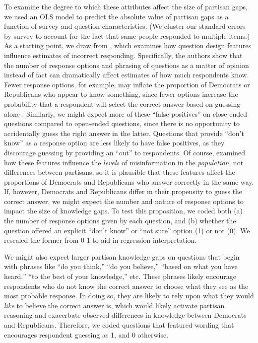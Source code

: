 \documentclass[12pt, letterpaper]{article}
\begin{document}
To examine the degree to which these attributes affect the size of partisan gaps, we used an OLS model to predict the absolute value of partisan gaps as a function of survey and question characteristics. (We cluster our standard errors by survey to account for the fact that same people responded to multiple items.) As a starting point, we draw from \citet{luskinetal_nd}, which examines how question design features influence estimates of incorrect responding. Specifically, the authors show that the number of response options and phrasing of questions as a matter of opinion instead of fact can dramatically affect estimates of how much respondents know. Fewer response options, for example, may inflate the proportion of Democrats or Republicans who appear to know something, since fewer options increase the probability that a respondent will select the correct answer based on guessing alone \citep[][4]{luskinetal_nd}. Similarly, we might expect more of these ``false positives'' on close-ended questions compared to open-ended questions, since there is no opportunity to accidentally guess the right answer in the latter. Questions that provide ``don't know'' as a response option are less likely to have false positives, as they discourage guessing by providing an ``out'' to respondents. Of course, \citet{luskinetal_nd} examined how these features influence the \textit{levels} of misinformation in the \textit{population}, not differences between partisans, so it is plausible that these features affect the proportions of Democrats and Republicans who answer correctly in the same way. If, however, Democrats and Republicans differ in their propensity to guess the correct answer, we might expect the number and nature of response options to impact the size of knowledge gaps. To test this proposition, we coded both (a) the number of response options given by each question, and (b) whether the question offered an explicit ``don't know'' or ``not sure'' option (1) or not (0). We rescaled the former from 0-1 to aid in regression interpretation. 

We might also expect larger partisan knowledge gaps on questions that begin with phrases like ``do you think,'' ``do you believe,'' ``based on what you have heard,'' ``to the best of your knowledge,'' etc. These phrases likely encourage respondents who do not know the correct answer to choose what they see as the most probable response. In doing so, they are likely to rely upon what they would \textit{like} to believe the correct answer is, which would likely activate partisan reasoning and exacerbate observed differences in knowledge between Democrats and Republicans. Therefore, we coded questions that featured wording that encourages respondent guessing as 1, and 0 otherwise. 
\end{document}
